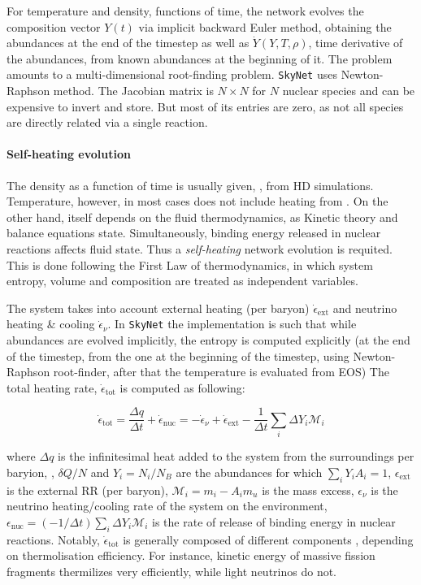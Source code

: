 For temperature and density, functions of time, the network evolves the composition vector $Y(t)$ via implicit backward Euler method, obtaining the abundances at the end of the timestep as well as $\dot{Y}(Y,T,\rho)$, time derivative of the abundances, from known abundances at the beginning of it. 
The problem amounts to a multi-dimensional root-finding problem. \texttt{SkyNet} uses Newton-Raphson method. The Jacobian matrix is $N\times N$ for $N$ nuclear species and can be expensive to invert and store. But most of its entries are zero, as not all species are directly related via a single reaction. 


\paragraph{Self-heating evolution}

The density as a function of time is usually given, \eg, from \ac{HD} simulations. Temperature, however, in most cases does not include heating from \nuc{}. On the other hand, \nuc{} itself depends on the fluid thermodynamics, as Kinetic theory and balance equations state. Simultaneously, binding energy released in nuclear reactions affects fluid state. Thus a \textit{self-heating} network evolution is requited. This is done following the First Law of thermodynamics, in which system entropy, volume and composition are treated as independent variables.

The system takes into account external heating (per baryon) $\dot{\epsilon}_{\text{ext}}$ and neutrino heating \& cooling $\dot{\epsilon}_{\nu}$.
In \texttt{SkyNet} the implementation is such that while abundances are evolved implicitly,
the entropy is computed explicitly (at the end of the timestep, from the one at the beginning of the timestep, using Newton-Raphson root-finder, after that the temperature is evaluated from \ac{EOS})
The total heating rate, $\dot{\epsilon}_{\text{tot}}$ is computed as following:

\begin{equation}
\dot{\epsilon}_{\text{tot}} = \frac{\Delta q}{\Delta t} + \dot{\epsilon}_{\text{nuc}} = -\dot{\epsilon}_{\nu} + \dot{\epsilon}_{\text{ext}} - \frac{1}{\Delta t}\sum_i \Delta Y_i \mathcal{M}_i
\end{equation}

where $\Delta q$ is the infinitesimal heat added to the system from the surroundings per baryion, \ie, $\delta Q/N$ and $Y_i=N_i/N_B$ are the abundances for which $\sum_i Y_i A_i = 1$, $\epsilon_{\text{ext}}$ is the external \ac{RR} (per baryon), $\mathcal{M}_i=m_i - A_i m_u$ is the mass excess, $\epsilon_{\nu}$ is the neutrino heating/cooling rate of the system on the environment, $\epsilon_{\text{nuc}} = (-1/\Delta t)\sum_i\Delta Y_i \mathcal{M}_i$ is the rate of release of binding energy in nuclear reactions.
Notably, $\dot{\epsilon}_{\text{tot}}$ is generally composed of different components \citep{Barnes:2016umi},
 depending on thermolisation efficiency. For instance, kinetic energy of massive fission fragments thermilizes very efficiently, while light neutrinos do not.  


